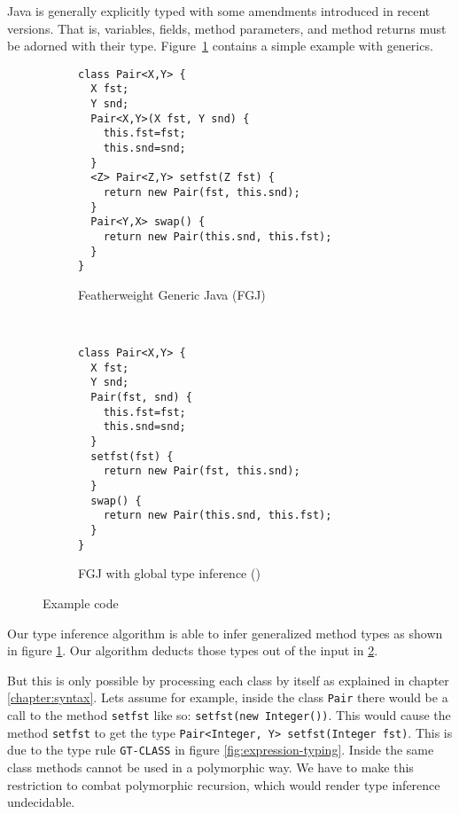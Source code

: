Java is generally explicitly typed with some amendments introduced in
recent versions. That is, 
variables, fields, method parameters, and method returns must be
adorned with their type. Figure~\ref{fig:intro-example-generic-fj}
contains a simple example with generics.
\begin{figure}[tp]
  \begin{subfigure}[t]{0.49\linewidth}
\begin{lstlisting}[style=fgj]
class Pair<X,Y> {
  X fst;
  Y snd;
  Pair<X,Y>(X fst, Y snd) {
    this.fst=fst;
    this.snd=snd;
  }
  <Z> Pair<Z,Y> setfst(Z fst) {
    return new Pair(fst, this.snd);
  }
  Pair<Y,X> swap() {
    return new Pair(this.snd, this.fst);
  }
}  
\end{lstlisting}
    \caption{Featherweight Generic Java (FGJ)}
    \label{fig:intro-example-generic-fj}
  \end{subfigure}
  ~
  \begin{subfigure}[t]{0.49\linewidth}
\begin{lstlisting}[style=tfgj]
class Pair<X,Y> {
  X fst;
  Y snd;
  Pair(fst, snd) {
    this.fst=fst; 
    this.snd=snd;
  }
  setfst(fst) {
    return new Pair(fst, this.snd);
  }
  swap() {
    return new Pair(this.snd, this.fst);
  }
}  
\end{lstlisting}
    \caption{FGJ with global type inference (\TFGJ)}
    \label{fig:intro-example-generic-jtx}
  \end{subfigure}
  \caption{Example code}
  \label{fig:intro-example-code}
\end{figure}

Our type inference algorithm is able to infer generalized method types
as shown in figure \ref{fig:intro-example-generic-fj}.
Our algorithm deducts those types out of the input in \ref{fig:intro-example-generic-jtx}.

But this is only possible by processing each class by itself as explained in chapter \ref{chapter:syntax}.
Lets assume for example, inside the class \texttt{Pair} there would be a call to the method \texttt{setfst} like so:
\texttt{setfst(new Integer())}.
This would cause the method \texttt{setfst} to get the type \texttt{Pair<Integer, Y> setfst(Integer fst)}.
This is due to the type rule \texttt{GT-CLASS} in figure \ref{fig:expression-typing}.
Inside the same class methods cannot be used in a polymorphic way.
We have to make this restriction to combat polymorphic recursion, which would render type inference undecidable.

